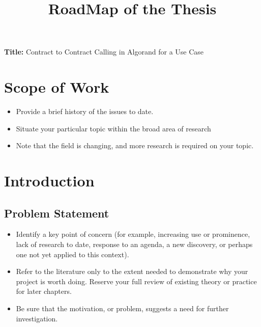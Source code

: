 \documentclass[12pt, a4paper]{article}
\title{RoadMap of the Thesis}
\author{}
\date{}
\newcommand{\namelistlabel}[1]{\mbox{#1}\hfil}
\newenvironment{namelist}[1]{%
\begin{list}{}
    {
        \let\makelabel\namelistlabel
        \settowidth{\labelwidth}{#1}
        \setlength{\leftmargin}{1.1\labelwidth}
    }
  }{%
\end{list}}
\begin{document}
\maketitle

\begin{namelist}{xxxxxxxxxxxx}
\item[{\bf Title:}]
	Contract to Contract Calling in Algorand for a Use Case
\end{namelist}

\section*{Scope of Work}
\begin{itemize}
\item Provide a brief history of the issues to date.
\item Situate your particular topic within the broad area of research
\item Note that the field is changing, and more research is required on your topic.
\end{itemize}

\section*{Introduction} 

\subsection{Problem Statement}
\begin{itemize}
\item Identify a key point of concern (for example, increasing use or prominence, lack of research to date, response to an agenda, a new discovery, or perhaps one not yet applied to this context).

\item Refer to the literature only to the extent needed to demonstrate why your project is worth doing. Reserve your full review of existing theory or practice for later chapters.

\item Be sure that the motivation, or problem, suggests a need for further investigation.

\end{itemize}
\end{document}
